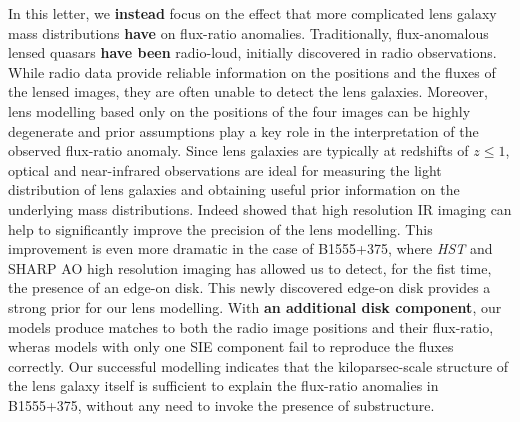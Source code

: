 \documentclass[useAMS,usenatbib]{mn2e}
\begin{document}
In this letter, we \textbf{instead} focus on the effect that more complicated lens galaxy mass
distributions \textbf{have} on flux-ratio anomalies.
Traditionally, flux-anomalous lensed quasars \textbf{have been} radio-loud, initially discovered in radio observations. While radio data
provide reliable information on the positions and the fluxes of the
lensed images, they are often unable to detect the lens
galaxies. Moreover, lens modelling based only on the positions of the
four images can be highly degenerate and prior assumptions play a key
role in the interpretation of the observed flux-ratio anomaly.  Since
lens galaxies are typically at redshifts of $z \leq 1$, optical and
near-infrared observations are ideal for measuring the light distribution
of lens galaxies and obtaining useful prior information on the underlying
mass distributions. Indeed \citet{SHARP12} showed that high
resolution IR imaging can help to significantly improve the precision
of the lens modelling. This improvement is even more dramatic in the
case of B1555+375, where \textit{HST} and SHARP AO high resolution imaging has
allowed us to detect, for the fist time, the presence of an edge-on
disk. This newly discovered edge-on disk provides a strong prior for our
lens modelling.  With \textbf{an additional disk component}, our models produce
matches to both the radio image positions and their flux-ratio, wheras
models with only one SIE component \citep{Marlow99,Xu14} fail to
reproduce the fluxes correctly. Our successful modelling indicates
that the kiloparsec-scale structure of the lens galaxy itself is
sufficient to explain the flux-ratio anomalies in B1555+375, without
any need to invoke the presence of substructure.
\end{document}

